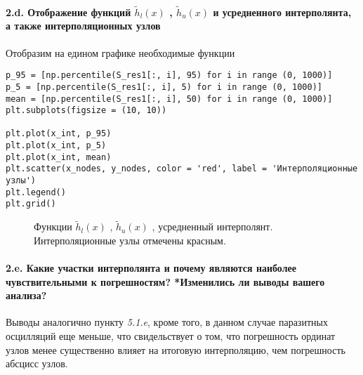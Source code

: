 \paragraph{2.d. Отображение функций  $\tilde{h}_l(x)$ , $\tilde{h}_u(x)$ 
 и усредненного интерполянта, а также интерполяционных узлов\\ }
\begin{flushleft}
Отобразим на едином графике необходимые функции
\end{flushleft}
\begin{lstlisting}
p_95 = [np.percentile(S_res1[:, i], 95) for i in range (0, 1000)]
p_5 = [np.percentile(S_res1[:, i], 5) for i in range (0, 1000)]
mean = [np.percentile(S_res1[:, i], 50) for i in range (0, 1000)]
plt.subplots(figsize = (10, 10))
 
plt.plot(x_int, p_95)
plt.plot(x_int, p_5)
plt.plot(x_int, mean)
plt.scatter(x_nodes, y_nodes, color = 'red', label = 'Интерполяционные узлы')
plt.legend()
plt.grid()
\end{lstlisting}
\begin{figure}[h]
\caption{Функции $\tilde{h}_l(x)$ , $\tilde{h}_u(x)$ 
, усредненный интерполянт. Интерполяционные узлы отмечены красным.}
\end{figure}
\paragraph{2.e. Какие участки интерполянта и почему являются наиболее чувствительными к погрешностям? *Изменились ли выводы вашего анализа? \\}
\begin{flushleft}
Выводы аналогично пункту \textit{5.1.e}, кроме того, в данном случае паразитных осцилляций еще меньше, что свидельствует о том, что погрешность ординат узлов  менее существенно влияет на итоговую интерполяцию, чем погрешность абсцисс узлов.
\end{flushleft}
\clearpage

